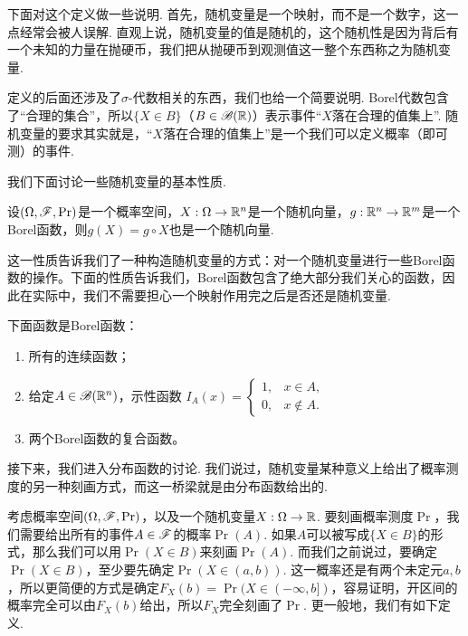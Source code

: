 下面对这个定义做一些说明. 首先，随机变量是一个映射，而不是一个数字，这一点经常会被人误解. 直观上说，随机变量的值是随机的，这个随机性是因为背后有一个未知的力量在抛硬币，我们把从抛硬币到观测值这一整个东西称之为随机变量. 

定义的后面还涉及了$\sigma$-代数相关的东西，我们也给一个简要说明. Borel代数包含了“合理的集合”，所以$\{X\in B\}$（$B\in\mathscr{B}(\mathbb{R})$）表示事件“$X$落在合理的值集上”. 随机变量的要求其实就是，“$X$落在合理的值集上”是一个我们可以定义概率（即可测）的事件. 

我们下面讨论一些随机变量的基本性质. 

\begin{proposition}\label{prop:random-variable}
设$(\Omega,\mathscr{F},\Pr)$是一个概率空间，$X:\Omega\to\mathbb{R}^n$是一个随机向量，$g:\mathbb{R}^n\to\mathbb{R}^m$是一个Borel函数，则$g(X)=g\circ X$也是一个随机向量. 
\end{proposition}

这一性质告诉我们了一种构造随机变量的方式：对一个随机变量进行一些Borel函数的操作。下面的性质告诉我们，Borel函数包含了绝大部分我们关心的函数，因此在实际中，我们不需要担心一个映射作用完之后是否还是随机变量.

\begin{proposition}\label{prop:borel-function}
下面函数是Borel函数：
\begin{enumerate}
    \item 所有的连续函数；
    \item 给定$A\in\mathscr{B}(\mathbb{R}^n)$，示性函数
    $I_A(x) = \begin{cases}
        1, & x\in A,\\
        0, & x\notin A.
    \end{cases}$
    \item 两个Borel函数的复合函数。
\end{enumerate}
\end{proposition}



接下来，我们进入分布函数的讨论. 我们说过，随机变量某种意义上给出了概率测度的另一种刻画方式，而这一桥梁就是由分布函数给出的. 

考虑概率空间$(\Omega,\mathscr{F},\Pr)$，以及一个随机变量$X:\Omega\to\mathbb{R}$. 要刻画概率测度$\Pr$，我们需要给出所有的事件$A\in\mathscr{F}$的概率$\Pr(A)$. 如果$A$可以被写成$\{X\in B\}$的形式，那么我们可以用$\Pr(X\in B)$来刻画$\Pr(A)$. 而我们之前说过，要确定$\Pr(X\in B)$，至少要先确定$\Pr(X\in(a,b))$. 这一概率还是有两个未定元$a,b$，所以更简便的方式是确定$F_X(b)=\Pr(X\in(-\infty,b])$，容易证明，开区间的概率完全可以由$F_X(b)$给出，所以$F_X$完全刻画了$\Pr$. 更一般地，我们有如下定义. 

